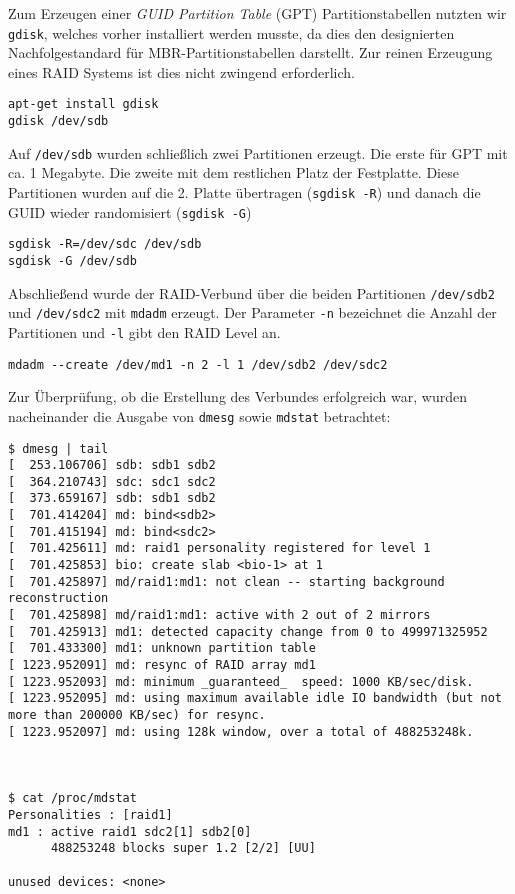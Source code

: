 Zum Erzeugen einer \emph{GUID Partition Table} (GPT) Partitionstabellen nutzten wir \verb#gdisk#, welches vorher installiert werden musste, da dies den designierten Nachfolgestandard für MBR-Partitionstabellen darstellt. Zur reinen Erzeugung eines RAID Systems ist dies nicht zwingend erforderlich.
\begin{verbatim}
apt-get install gdisk
gdisk /dev/sdb
\end{verbatim}
Auf \verb#/dev/sdb# wurden schließlich zwei Partitionen erzeugt. Die erste für GPT mit ca. 1 Megabyte. Die zweite mit dem restlichen Platz der Festplatte.
Diese Partitionen wurden auf die 2. Platte übertragen (\verb#sgdisk -R#) und danach die GUID wieder randomisiert (\verb#sgdisk -G#)
\begin{verbatim}
sgdisk -R=/dev/sdc /dev/sdb
sgdisk -G /dev/sdb
\end{verbatim}
Abschließend wurde der RAID-Verbund über die beiden Partitionen \verb#/dev/sdb2# und \verb#/dev/sdc2# mit \verb#mdadm# erzeugt. Der Parameter \verb#-n# bezeichnet die Anzahl der Partitionen und \verb#-l# gibt den RAID Level an.
\begin{verbatim}
mdadm --create /dev/md1 -n 2 -l 1 /dev/sdb2 /dev/sdc2
\end{verbatim}
Zur Überprüfung, ob die Erstellung des Verbundes erfolgreich war, wurden nacheinander die Ausgabe von \verb#dmesg# sowie \verb#mdstat# betrachtet:
\setupVerbatimOut
\begin{verbatim}
$ dmesg | tail
[  253.106706] sdb: sdb1 sdb2
[  364.210743] sdc: sdc1 sdc2
[  373.659167] sdb: sdb1 sdb2
[  701.414204] md: bind<sdb2>
[  701.415194] md: bind<sdc2>
[  701.425611] md: raid1 personality registered for level 1
[  701.425853] bio: create slab <bio-1> at 1
[  701.425897] md/raid1:md1: not clean -- starting background reconstruction
[  701.425898] md/raid1:md1: active with 2 out of 2 mirrors
[  701.425913] md1: detected capacity change from 0 to 499971325952
[  701.433300] md1: unknown partition table
[ 1223.952091] md: resync of RAID array md1
[ 1223.952093] md: minimum _guaranteed_  speed: 1000 KB/sec/disk.
[ 1223.952095] md: using maximum available idle IO bandwidth (but not more than 200000 KB/sec) for resync.
[ 1223.952097] md: using 128k window, over a total of 488253248k.



$ cat /proc/mdstat
Personalities : [raid1] 
md1 : active raid1 sdc2[1] sdb2[0]
      488253248 blocks super 1.2 [2/2] [UU]
      
unused devices: <none>
\end{verbatim}

